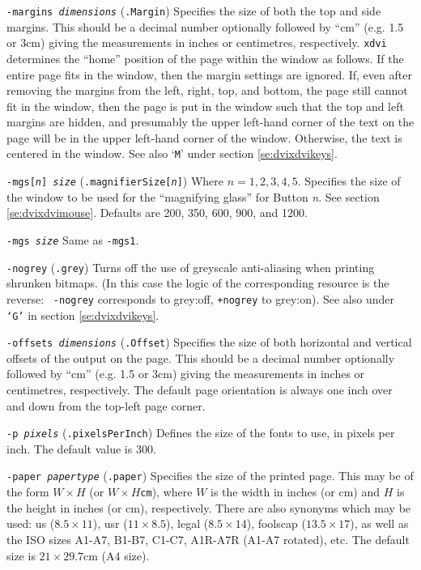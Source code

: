 \begin{list}
\item[\tt-margins \em dimensions]
({\tt .Margin})
Specifies the size of both the top and side margins.  This
should be a decimal number optionally followed by ``cm'' (e.g. 1.5 or 3cm)
giving the measurements in inches or centimetres, respectively. \verb+xdvi+ determines
the ``home'' position of the page within the window as follows.  If the entire
page fits in the window, then the margin settings are ignored.  If, even
after removing the margins from the left, right, top, and bottom, the page
still cannot fit in the window, then the page is put in the window such that
the top and left margins are hidden, and presumably the upper left-hand corner
of the text on the page will be in the upper left-hand corner of the window.
Otherwise, the text is centered in the window.  See also `{\tt M}' under
section \ref{se:dvixdvikeys}.


\item[\tt-mgs{[{\em n}] \em size}]
({\tt .magnifierSize[{\em n}]})
Where $n=1,2,3,4,5$.
Specifies the size of the window to be used for the ``magnifying glass''
for Button {\em n}.  See section \ref{se:dvixdvimouse}.  Defaults are 200,
350, 600, 900, and 1200.

\item[\tt-mgs \em size]
Same as {\tt -mgs1}.

\item[\tt-nogrey]
({\tt .grey})
Turns off the use of greyscale anti-aliasing when printing shrunken bitmaps.
(In this case the logic of the corresponding resource is the reverse: {\tt
-nogrey} corresponds to grey:off, {\tt +nogrey} to grey:on). See also under
{\tt `G'} in section \ref{se:dvixdvikeys}.

\item[\tt-offsets \em dimensions]
({\tt .Offset})
Specifies the size of both horizontal and vertical offsets of the output on the
page. This should be a decimal number optionally followed by ``cm'' (e.g. 1.5
or 3cm) giving the measurements in inches or centimetres, respectively. The
default page orientation is always one inch over and down from the top-left
page corner.

\item[\tt-p \em pixels]
({\tt .pixelsPerInch})
Defines the size of the fonts to use, in pixels per inch.  The
default value is 300.

\item[\tt-paper \em papertype]
({\tt .paper})
Specifies the size of the printed page.  This may be of the form
$W\times H$ (or $W\times H${\tt cm}), where $W$ is the width in
inches (or cm) and $H$ is the height in inches (or cm), respectively.
There are also synonyms which may be used:  us ($8.5\times 11$), usr ($11\times
8.5$),
legal ($8.5\times 14$), foolscap ($13.5\times 17$), as well as the ISO sizes 
A1-A7,
B1-B7, C1-C7, A1R-A7R (A1-A7 rotated), etc.  The default size is
$21\times 29.7$cm (A4 size).


\end{list}

